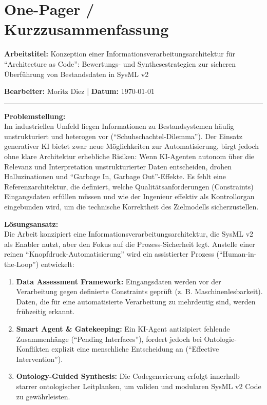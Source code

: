 \documentclass[11pt, a4paper]{article}
\begin{document}
\section*{One-Pager / Kurzzusammenfassung}
\textbf{Arbeitstitel:} Konzeption einer Informationsverarbeitungsarchitektur für \enquote{Architecture as Code}: Bewertungs- und Synthesestrategien zur sicheren Überführung von Bestandsdaten in SysML v2

\textbf{Bearbeiter:} Moritz Diez \quad | \quad \textbf{Datum:} \today

\vspace{0.5cm}
\hrule
\vspace{0.5cm}

\textbf{Problemstellung:} \\
Im industriellen Umfeld liegen Informationen zu Bestandsystemen häufig unstrukturiert und heterogen vor (\enquote{Schuhschachtel-Dilemma}). Der Einsatz generativer KI bietet zwar neue Möglichkeiten zur Automatisierung, birgt jedoch ohne klare Architektur erhebliche Risiken: Wenn KI-Agenten autonom über die Relevanz und Interpretation unstrukturierter Daten entscheiden, drohen Halluzinationen und \enquote{Garbage In, Garbage Out}-Effekte. Es fehlt eine Referenzarchitektur, die definiert, welche Qualitätsanforderungen (Constraints) Eingangsdaten erfüllen müssen und wie der Ingenieur effektiv als Kontrollorgan eingebunden wird, um die technische Korrektheit des Zielmodells sicherzustellen.

\vspace{0.5cm}

\textbf{Lösungsansatz:} \\
Die Arbeit konzipiert eine Informationsverarbeitungsarchitektur, die SysML v2 als Enabler nutzt, aber den Fokus auf die Prozess-Sicherheit legt. Anstelle einer reinen \enquote{Knopfdruck-Automatisierung} wird ein assistierter Prozess (\enquote{Human-in-the-Loop}) entwickelt:
\begin{enumerate}
    \item \textbf{Data Assessment Framework:} Eingangsdaten werden vor der Verarbeitung gegen definierte Constraints geprüft (z. B. Maschinenlesbarkeit). Daten, die für eine automatisierte Verarbeitung zu mehrdeutig sind, werden frühzeitig erkannt.
    \item \textbf{Smart Agent \& Gatekeeping:} Ein KI-Agent antizipiert fehlende Zusammenhänge (\enquote{Pending Interfaces}), fordert jedoch bei Ontologie-Konflikten explizit eine menschliche Entscheidung an (\enquote{Effective Intervention}).
    \item \textbf{Ontology-Guided Synthesis:} Die Codegenerierung erfolgt innerhalb starrer ontologischer Leitplanken, um validen und modularen SysML v2 Code zu gewährleisten.
\end{enumerate}
\end{document}

